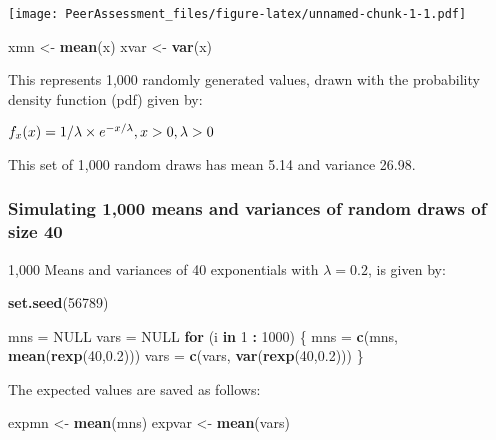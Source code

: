 \documentclass[]{article}
\newenvironment{Shaded}{\begin{snugshade}}{\end{snugshade}}
\newcommand{\ControlFlowTok}[1]{\textcolor[rgb]{0.13,0.29,0.53}{\textbf{#1}}}
\newcommand{\DecValTok}[1]{\textcolor[rgb]{0.00,0.00,0.81}{#1}}
\newcommand{\FloatTok}[1]{\textcolor[rgb]{0.00,0.00,0.81}{#1}}
\newcommand{\KeywordTok}[1]{\textcolor[rgb]{0.13,0.29,0.53}{\textbf{#1}}}
\newcommand{\NormalTok}[1]{#1}
\newcommand{\OperatorTok}[1]{\textcolor[rgb]{0.81,0.36,0.00}{\textbf{#1}}}
\newcommand{\OtherTok}[1]{\textcolor[rgb]{0.56,0.35,0.01}{#1}}
\newcommand{\StringTok}[1]{\textcolor[rgb]{0.31,0.60,0.02}{#1}}
\begin{document}
\texttt{[image: PeerAssessment\_files/figure-latex/unnamed-chunk-1-1.pdf]}

\begin{Shaded}
\begin{Highlighting}[]
\NormalTok{xmn <-}\StringTok{ }\KeywordTok{mean}\NormalTok{(x)}
\NormalTok{xvar <-}\StringTok{ }\KeywordTok{var}\NormalTok{(x)}
\end{Highlighting}
\end{Shaded}

This represents 1,000 randomly generated values, drawn with the
probability density function (pdf) given by:

\(f_x (x) = 1/\lambda \times e ^{-x/\lambda}, \space \space x>0, \space \lambda >0\)

This set of 1,000 random draws has mean 5.14 and variance 26.98.

\hypertarget{simulating-1000-means-and-variances-of-random-draws-of-size-40}{%
\subsubsection{Simulating 1,000 means and variances of random draws of
size
40}\label{simulating-1000-means-and-variances-of-random-draws-of-size-40}}

1,000 Means and variances of 40 exponentials with \(\lambda = 0.2\), is
given by:

\begin{Shaded}
\begin{Highlighting}[]
\KeywordTok{set.seed}\NormalTok{(}\DecValTok{56789}\NormalTok{)}

\NormalTok{mns =}\StringTok{ }\OtherTok{NULL}
\NormalTok{vars =}\StringTok{ }\OtherTok{NULL}
\ControlFlowTok{for}\NormalTok{ (i }\ControlFlowTok{in} \DecValTok{1} \OperatorTok{:}\StringTok{ }\DecValTok{1000}\NormalTok{) \{}
\NormalTok{        mns =}\StringTok{ }\KeywordTok{c}\NormalTok{(mns, }\KeywordTok{mean}\NormalTok{(}\KeywordTok{rexp}\NormalTok{(}\DecValTok{40}\NormalTok{,}\FloatTok{0.2}\NormalTok{)))}
\NormalTok{        vars =}\StringTok{ }\KeywordTok{c}\NormalTok{(vars, }\KeywordTok{var}\NormalTok{(}\KeywordTok{rexp}\NormalTok{(}\DecValTok{40}\NormalTok{,}\FloatTok{0.2}\NormalTok{)))}
\NormalTok{\}}
\end{Highlighting}
\end{Shaded}

The expected values are saved as follows:

\begin{Shaded}
\begin{Highlighting}[]
\NormalTok{expmn <-}\StringTok{ }\KeywordTok{mean}\NormalTok{(mns)}
\NormalTok{expvar <-}\StringTok{ }\KeywordTok{mean}\NormalTok{(vars)}
\end{Highlighting}
\end{Shaded}
\end{document}
